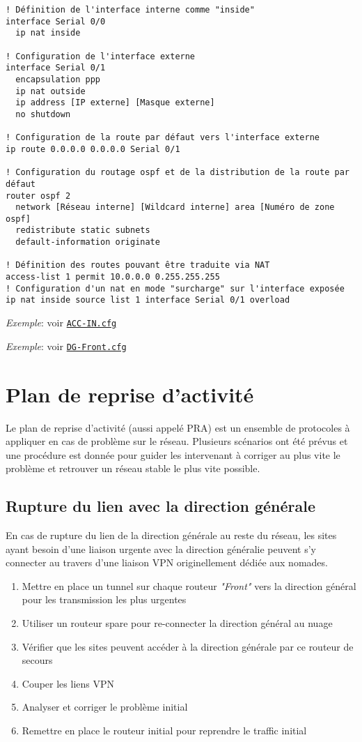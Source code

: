 \documentclass{article}
\newcommand{\seefile}[1]{
  \begin{center}
  \begin{minipage}{0.9\textwidth}
    \emph{Exemple}: voir \texttt{\href{https://github.com/EpicKiwi/Wide-Network-Project-Cesi-A4/blob/master/network/#1}{#1}}
  \end{minipage}
  \end{center}
}
\begin{document}
\begin{lstlisting}[caption=Configuration d'un accès internet avec NAT]
! Définition de l'interface interne comme "inside"
interface Serial 0/0
  ip nat inside

! Configuration de l'interface externe
interface Serial 0/1
  encapsulation ppp
  ip nat outside
  ip address [IP externe] [Masque externe]
  no shutdown

! Configuration de la route par défaut vers l'interface externe
ip route 0.0.0.0 0.0.0.0 Serial 0/1

! Configuration du routage ospf et de la distribution de la route par défaut
router ospf 2
  network [Réseau interne] [Wildcard interne] area [Numéro de zone ospf]
  redistribute static subnets
  default-information originate

! Définition des routes pouvant être traduite via NAT
access-list 1 permit 10.0.0.0 0.255.255.255
! Configuration d'un nat en mode "surcharge" sur l'interface exposée
ip nat inside source list 1 interface Serial 0/1 overload
\end{lstlisting}

\seefile{ACC-IN.cfg}
\seefile{DG-Front.cfg}

\section{Plan de reprise d'activité}

Le plan de reprise d'activité (aussi appelé PRA) est un ensemble de protocoles à appliquer en cas de problème sur le réseau.
Plusieurs scénarios ont été prévus et une procédure est donnée pour guider les intervenant à corriger au plus vite le problème et retrouver un réseau stable le plus vite possible.

\subsection{Rupture du lien avec la direction générale}

En cas de rupture du lien de la direction générale au reste du réseau, les sites ayant besoin d'une liaison urgente avec la direction généralie peuvent s'y connecter au travers d'une liaison VPN originellement dédiée aux nomades.

\bigskip

\begin{enumerate}
\item Mettre en place un tunnel sur chaque routeur \emph{"Front"} vers la direction général pour les transmission les plus urgentes
\item Utiliser un routeur spare pour re-connecter la direction général au nuage
\item Vérifier que les sites peuvent accéder à la direction générale par ce routeur de secours
\item Couper les liens VPN
\item Analyser et corriger le problème initial
\item Remettre en place le routeur initial pour reprendre le traffic initial
\end{enumerate}
\end{document}
